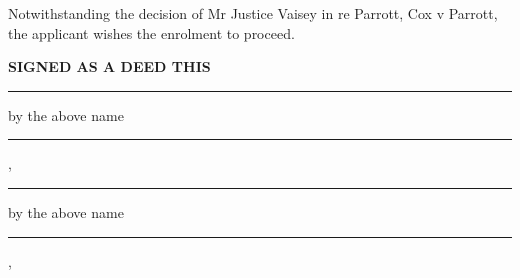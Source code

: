\documentclass[11pt]{extarticle}
\begin{document}
\vskip 4mm

Notwithstanding the decision of Mr Justice Vaisey in re Parrott, Cox v Parrott, the applicant wishes the
enrolment to proceed.

\vskip 4mm

\textbf{SIGNED AS A DEED THIS \dateline}

\vskip 2.5cm

\begin{minipage}{0.5\textwidth}
    \centering \rule{0.75\textwidth}{0.5pt}
    
    by the above name

    \name

    \vskip 2cm

    \centering \rule{0.75\textwidth}{0.5pt}
    
    \witnessOneName

    \witnessOneStreet, \witnessOneTown
\end{minipage}%
\begin{minipage}{0.5\textwidth}
    \centering \rule{0.75\textwidth}{0.5pt}
    
    by the above name

    \deadname

    \vskip 2cm

    \centering \rule{0.75\textwidth}{0.5pt}
    
    \witnessTwoName

    \witnessTwoStreet, \witnessTwoTown
\end{minipage}%
\end{document}
